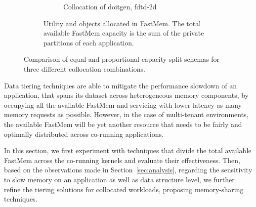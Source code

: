 \begin{figure}
\begin{subfigure}{\linewidth}
\begin{subfigure}{0.3\linewidth}
      \captionsetup{labelformat=empty}
    \caption{Collocation of doitgen, fdtd-2d}
    \end{subfigure}  
          \captionsetup{labelformat=empty}
  \caption{Utility and objects allocated in FastMem. The total available FastMem capacity is the sum of the private partitions of each application.}
  \end{subfigure}
  \caption{Comparison of equal and proportional capacity split schemas for three different collocation combinations.}
  \label{fig:tiering1}
    \vspace{-0.1in}
\end{figure}

Data tiering techniques are able to mitigate the performance slowdown of an application, that spans its dataset across heterogeneous memory components, 
by occupying all the available FastMem and servicing with lower latency as many memory requests as possible. However, in the case of multi-tenant environments, the available FastMem will be yet another resource that needs to be fairly and optimally distributed across co-running applications.

In this section, we first experiment with techniques that divide the total available FastMem across the co-running kernels and evaluate their effectiveness. Then, based on the observations made in Section~\ref{sec:analysis}, regarding the sensitivity to slow memory on an application as well as data structure level, we further refine the tiering solutions for collocated workloads, proposing memory-sharing techniques. 

